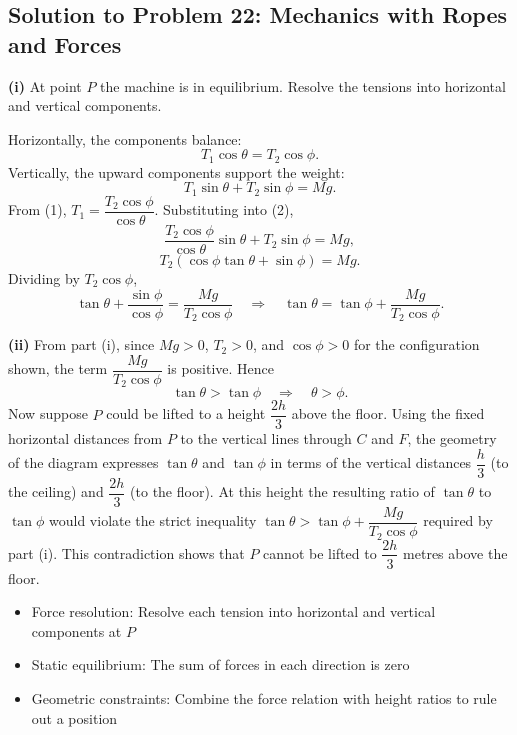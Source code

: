 \subsection{Solution to Problem 22: Mechanics with Ropes and Forces}

\begin{solution}
\textbf{(i)} At point $P$ the machine is in equilibrium. Resolve the tensions into horizontal and vertical components.

Horizontally, the components balance:
\[
T_1\cos\theta = T_2\cos\phi. \tag{1}
\]
Vertically, the upward components support the weight:
\[
T_1\sin\theta + T_2\sin\phi = Mg. \tag{2}
\]
From (1), $T_1 = \dfrac{T_2\cos\phi}{\cos\theta}$. Substituting into (2),
\[
\frac{T_2\cos\phi}{\cos\theta}\sin\theta + T_2\sin\phi = Mg,
\]
\[
T_2(\cos\phi\tan\theta + \sin\phi) = Mg.
\]
Dividing by $T_2\cos\phi$,
\[
\tan\theta + \frac{\sin\phi}{\cos\phi} = \frac{Mg}{T_2\cos\phi}
\quad\Longrightarrow\quad
\tan\theta = \tan\phi + \frac{Mg}{T_2\cos\phi}.
\]

\textbf{(ii)} From part (i), since $Mg > 0$, $T_2 > 0$, and $\cos\phi > 0$ for the configuration shown, the term $\dfrac{Mg}{T_2\cos\phi}$ is positive. Hence
\[
\tan\theta > \tan\phi \quad\Longrightarrow\quad \theta > \phi.
\]
Now suppose $P$ could be lifted to a height $\dfrac{2h}{3}$ above the floor. Using the fixed horizontal distances from $P$ to the vertical lines through $C$ and $F$, the geometry of the diagram expresses $\tan\theta$ and $\tan\phi$ in terms of the vertical distances $\dfrac{h}{3}$ (to the ceiling) and $\dfrac{2h}{3}$ (to the floor). At this height the resulting ratio of $\tan\theta$ to $\tan\phi$ would violate the strict inequality $\tan\theta > \tan\phi + \dfrac{Mg}{T_2\cos\phi}$ required by part (i). This contradiction shows that $P$ cannot be lifted to $\dfrac{2h}{3}$ metres above the floor.
\end{solution}

\begin{takeaways}
\begin{itemize}
    \item Force resolution: Resolve each tension into horizontal and vertical components at $P$
    \item Static equilibrium: The sum of forces in each direction is zero
    \item Geometric constraints: Combine the force relation with height ratios to rule out a position
\end{itemize}
\end{takeaways}

